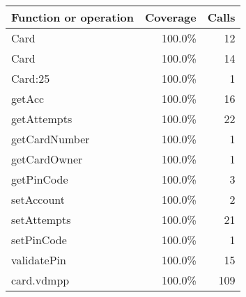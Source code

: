 \documentclass[a4paper]{article}
\begin{document}
\begin{longtable}{|l|r|r|}
\hline
Function or operation & Coverage & Calls \\
\hline
\hline
Card & 100.0\% & 12 \\
\hline
Card & 100.0\% & 14 \\
\hline
Card:25 & 100.0\% & 1 \\
\hline
getAcc & 100.0\% & 16 \\
\hline
getAttempts & 100.0\% & 22 \\
\hline
getCardNumber & 100.0\% & 1 \\
\hline
getCardOwner & 100.0\% & 1 \\
\hline
getPinCode & 100.0\% & 3 \\
\hline
setAccount & 100.0\% & 2 \\
\hline
setAttempts & 100.0\% & 21 \\
\hline
setPinCode & 100.0\% & 1 \\
\hline
validatePin & 100.0\% & 15 \\
\hline
\hline
card.vdmpp & 100.0\% & 109 \\
\hline
\end{longtable}
\end{document}
